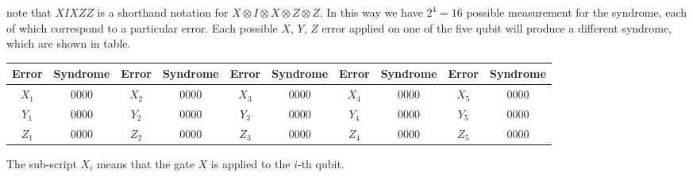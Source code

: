 \documentclass{article}
\begin{document}
 	\noindent note that $XIXZZ$ is a shorthand notation for $X\otimes I\otimes X\otimes Z\otimes Z$. In this way we have $2^4 = 16$ possible measurement for the syndrome, each of which correspond to a particular error. Each possible $X$, $Y$, $Z$ error applied on one of the five qubit will produce a different syndrome, which are shown in table. 
 	\begin{table}[H]
 		\centering
 		\begin{tabular}{|c|c|c|c|c|c|c|c|c|c|}
 			\hline
 			Error & Syndrome & Error & Syndrome & Error & Syndrome & Error & Syndrome & Error & Syndrome \\ \hline
 			$X_1$  & 0000 & $X_2$  & 0000 & $X_3$  & 0000 & $X_4$ & 0000 & $X_5$ & 0000 \\ \hline
 			$Y_1$  & 0000 & $Y_2$  & 0000 & $Y_3$  & 0000 & $Y_4$ & 0000 & $Y_5$ & 0000 \\ \hline
 			$Z_1$  & 0000 & $Z_2$  & 0000 & $Z_3$  & 0000 & $Z_4$ & 0000 & $Z_5$ & 0000 \\ \hline
 		\end{tabular}
 	\end{table}
 	The sub-script $X_i$ means that the gate $X$ is applied to the $i$-th qubit.
	 
	\newpage
	
	
\end{document}
